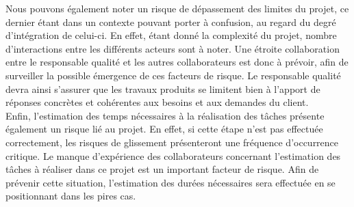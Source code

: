 Nous pouvons également noter un risque de dépassement des limites du projet, ce dernier étant dans un contexte pouvant porter à confusion, au regard du degré d’intégration de celui-ci. En effet, étant donné la complexité du projet, nombre d’interactions entre les différents acteurs sont à noter. Une étroite collaboration entre le responsable qualité et les autres collaborateurs est donc à prévoir, afin de surveiller la possible émergence de ces facteurs de risque. Le responsable qualité devra ainsi s’assurer que les travaux produits se limitent bien à l’apport de réponses concrètes et cohérentes aux besoins et aux demandes du client. \\

Enfin, l’estimation des temps nécessaires à la réalisation des tâches présente également un risque lié au projet. En effet, si cette étape n’est pas effectuée correctement, les risques de glissement présenteront une fréquence d’occurrence critique. Le manque d’expérience des collaborateurs concernant l’estimation des tâches à réaliser dans ce projet est un important facteur de risque. Afin de prévenir cette situation, l’estimation des durées nécessaires sera effectuée en se positionnant dans les pires cas.
